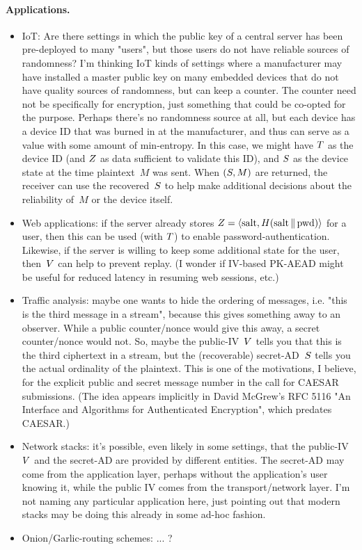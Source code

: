 \paragraph{Applications. }
\begin{itemize}
\item IoT: Are there settings in which the public key of a central server has been pre-deployed to many "users", but those users do not have reliable sources of randomness? I'm thinking IoT kinds of settings where a manufacturer may have installed a master public key on many embedded devices that do not have quality sources of randomness, but can keep a counter.  The counter need not be specifically for encryption, just something that could be co-opted for the purpose.  Perhaps there's no randomness source at all, but each device has a device ID that was burned in at the manufacturer, and thus can serve as a value with some amount of min-entropy.  In this case, we might have $T$ as the device ID (and $Z$ as data sufficient to validate this ID), and $S$ as the device state at the time plaintext~$M$ was sent.  When $(S,M)$ are returned, the receiver can use the recovered~$S$ to help make additional decisions about the reliability of~$M$ or the device itself.
%
\item Web applications: if the server already stores $Z=\langle \mathrm{salt},H(\mathrm{salt}\,\|\, \mathrm{pwd})\rangle$ for a user, then this can be used (with $T$) to enable password-authentication.  Likewise, if the server is willing to keep some additional state for the user, then~$V$ can help to prevent replay.  (I wonder if IV-based PK-AEAD might be useful for reduced latency in resuming web sessions, etc.)
%
\item Traffic analysis: maybe one wants to hide the ordering of messages, i.e. "this is the third message in a stream", because this gives something away to an observer.  While a public counter/nonce would give this away, a secret counter/nonce would not.  So, maybe the public-IV~$V$ tells you that this is the third ciphertext in a stream, but the (recoverable) secret-AD~$S$ tells you the actual ordinality of the plaintext.  This is one of the motivations, I believe, for the explicit public and secret message number in the call for CAESAR submissions.  (The idea appears implicitly in David McGrew's RFC 5116 "An Interface and Algorithms for Authenticated Encryption", which predates CAESAR.) 
%
\item Network stacks: it's possible, even likely in some settings, that the public-IV~$V$ and the secret-AD are provided by different entities.  The secret-AD may come from the application layer, perhaps without the application's user knowing it, while the public IV comes from the transport/network layer.  I'm not naming any particular application here, just pointing out that modern stacks may be doing this already in some ad-hoc fashion.
\item Onion/Garlic-routing schemes: ... ?

\end{itemize}
